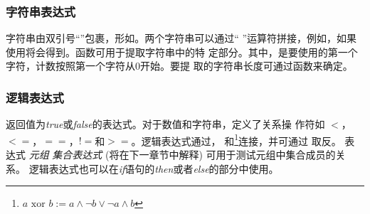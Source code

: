 \subsubsection{字符串表达式}
字符串由双引号“”包裹，形如。两个字符串可以通过“
\code{+}”运算符拼接，例如，如果使用将会得到。函数可用于提取字符串中的特
定部分。其中，是要使用的第一个字符，计数按照第一个字符从0开始。要提
取的字符串长度可通过函数来确定。


\subsubsection{逻辑表达式}
返回值为\emph{true}或\emph{false}的表达式。对于数值和字符串，定义了关系操
作符如 $<$，$<=$，$==$，$!\!\!=$和$>=$。逻辑表达式通过，
和\footnote{
  $a \text{ xor } b :=a\wedge\neg b\vee \neg a\wedge b$}连接，并可通过
取反。
表达式 \emph{元组}  \emph{集合表达式} (将在下一章节中解释)
可用于测试元组中集合成员的关系。
逻辑表达式也可以在\emph{if}语句的\emph{then}或者\emph{else}的部分中使用。

